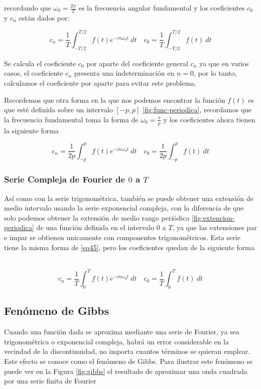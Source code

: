 recordando que $\omega_0 = \frac{2\pi}{T}$ es la frecuencia angular fundamental y los coeficientes $c_0$ y $c_n$ están dados por: 

\begin{equation}\label{eq43}
	c_n = \frac{1}{T} \int_{-T/2}^{T/2} f(t) e^{-i n \omega_0 t} \ dt \quad c_0 = \frac{1}{T} \int_{-T/2}^{T/2} f(t)\ dt 
\end{equation}

Se calcula el coeficiente $c_0$ por aparte del coeficiente general $c_n$ ya que en varios casos, el coeficiente $c_n$ presenta una indeterminación en $n=0$, por lo tanto, calculamos el coeficiente por aparte para evitar este problema.\newline

Recordemos que otra forma en la que nos podemos encontrar la función $f(t)$ es que esté definida sobre un intervalo $[-p, p]$ \ref{fig:func-periodica}, recordamos que la frecuencia fundamental toma la forma de $\omega_0 = \frac{\pi}{p}$ y los coeficientes ahora tienen la siguiente forma

\begin{equation}\label{eq44}
	c_n = \frac{1}{2p} \int_{-p}^{p} f(t) e^{-i n \omega_0 t} \ dt \quad c_0 = \frac{1}{2p} \int_{-p}^{p} f(t)\ dt 
\end{equation}

\subsubsection{Serie Compleja de Fourier de $0$ a $T$}
Así como con la serie trigonométrica, también se puede obtener una extensión de medio intervalo usando la serie exponencial compleja, con la diferencia de que solo podemos obtener la extensión de medio rango periódica \ref{fig:extencion-periodica} de una función definida en el intervalo $0$ a $T$, ya que las extensiones par e impar se obtienen unicamente con componentes trigonométricos. Esta serie tiene la misma forma de \eqref{eq45}, pero los coeficientes quedan de la siguiente forma ~\cite{fourierCinvestav}

\begin{equation}\label{eq46}
	c_n = \frac{1}{T} \int_{0}^{T} f(t) e^{-i n \omega_0 t} \ dt \quad c_0 = \frac{1}{T} \int_{0}^{T} f(t)\ dt 
\end{equation}

\subsection{Fenómeno de Gibbs}
Cuando una función dada se aproxima mediante una serie de Fourier, ya sea trigonométrica o exponencial compleja, habrá un error considerable en la vecindad de la discontinuidad, no importa cuantos términos se quieran emplear. Este efecto se conoce como el fenómeno de Gibbs. Para ilustrar este fenómeno se puede ver en la Figura \ref{fig:gibbs} el resultado de aproximar una onda cuadrada por una serie finita de Fourier ~\cite{fourierCarrillo}


